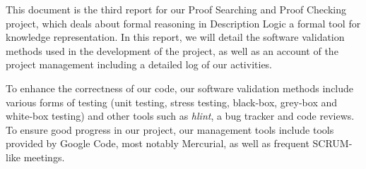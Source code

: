This document is the third report for our Proof Searching and Proof
Checking project, which deals about formal reasoning in Description
Logic a formal tool for knowledge representation. In this report, we
will detail the software validation methods used in the development of
the project, as well as an account of the project management including
a detailed log of our activities.

To enhance the correctness of our code, our software validation
methods include various forms of testing (unit testing, stress testing,
black-box, grey-box and white-box testing) and other tools such
as \emph{hlint}, a bug tracker and code reviews. To ensure good
progress in our project, our management tools include tools
provided by Google Code, most notably Mercurial, 
as well as frequent SCRUM-like meetings.

